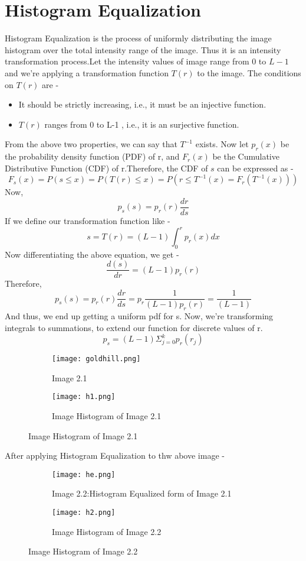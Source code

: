 \documentclass{report}
\begin{document}
\section{Histogram Equalization}
Histogram Equalization is the process of uniformly distributing the image histogram over the total intensity range of the image. Thus it is an intensity transformation process.Let the intensity values of image range from 0 to $L-1$ and we're applying a transformation function $T(r)$ to the image. The conditions on $T(r)$ are -
\begin{itemize}
    \item It should be strictly increasing, i.e., it must be an injective function.
    \item $ T(r) $ ranges from 0 to L-1 , i.e., it is an surjective function.
\end{itemize}
From the above two properties, we can say that $T^{-1}$ exists.
Now let $p_r(x)$ be the probability density function (PDF) of r, and $F_r(x)$ be the Cumulative Distributive Function (CDF) of r.Therefore, the CDF of $s$ can be expressed as -
\[F_s(x) = P(s \leq x) = P(T(r) \leq x) = P(r \leq T^{-1}(x) = F_r(T^{-1}(x)))\]
Now, \[p_s(s) = p_r(r)\frac{dr}{ds}\]
If we define our transformation function like - 
\[s = T(r) = (L-1)\int_{0}^{r}p_r(x)dx\]
Now differentiating the above equation, we get -
\[ \frac{d(s)}{dr} = (L-1)p_r(r)\]
Therefore, 
\[p_s(s) = p_r(r)\frac{dr}{ds} = p_r \frac{1}{(L-1)p_r(r)} = \frac{1}{(L-1)}\] 
And thus, we end up getting a uniform pdf for s. Now, we're transforming integrals to summations, to extend our function for discrete values of r.
\[p_s = (L-1)\Sigma_{j=0}^{k}p_r(r_j)\]
\begin{figure}[h]
    \begin{subfigure}{0.4\textwidth}
    \centering
    \texttt{[image: goldhill.png]}
    \caption{Image 2.1}
    \end{subfigure}
    \begin{subfigure}{0.4\textwidth}
    \centering
    \texttt{[image: h1.png]}
    \caption{Image Histogram of Image 2.1}
    \end{subfigure}
\end{figure}
After applying Histogram Equalization to thw above image -
\begin{figure}[h]
    \begin{subfigure}{0.4\textwidth}
    \centering
    \texttt{[image: he.png]}
    \caption{Image 2.2:Histogram Equalized form of Image 2.1}
    \end{subfigure}
    \begin{subfigure}{0.4\textwidth}
    \centering
    \texttt{[image: h2.png]}
    \caption{Image Histogram of Image 2.2}
    \end{subfigure}
\end{figure}
\end{document}

